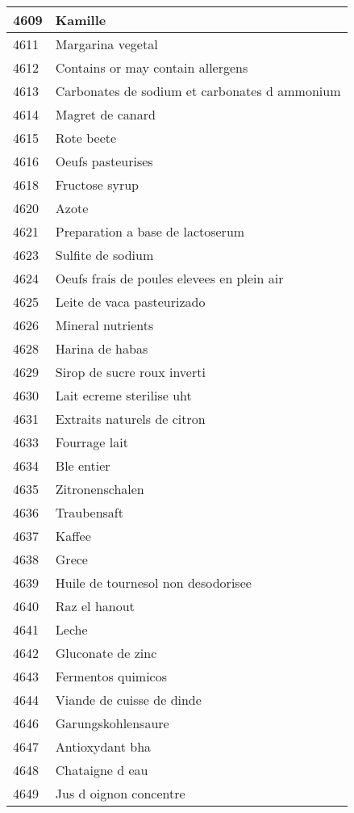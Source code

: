 \begin{longtable}{|l|l|}
4609 & Kamille \\ \hline 
4611 & Margarina vegetal \\ \hline 
4612 & Contains or may contain allergens \\ \hline 
4613 & Carbonates de sodium et carbonates d ammonium \\ \hline 
4614 & Magret de canard \\ \hline 
4615 & Rote beete \\ \hline 
4616 & Oeufs pasteurises \\ \hline 
4618 & Fructose syrup \\ \hline 
4620 & Azote \\ \hline 
4621 & Preparation a base de lactoserum \\ \hline 
4623 & Sulfite de sodium \\ \hline 
4624 & Oeufs frais de poules elevees en plein air \\ \hline 
4625 & Leite de vaca pasteurizado \\ \hline 
4626 & Mineral nutrients \\ \hline 
4628 & Harina de habas \\ \hline 
4629 & Sirop de sucre roux inverti \\ \hline 
4630 & Lait ecreme sterilise uht \\ \hline 
4631 & Extraits naturels de citron \\ \hline 
4633 & Fourrage lait \\ \hline 
4634 & Ble entier \\ \hline 
4635 & Zitronenschalen \\ \hline 
4636 & Traubensaft \\ \hline 
4637 & Kaffee \\ \hline 
4638 & Grece \\ \hline 
4639 & Huile de tournesol non desodorisee \\ \hline 
4640 & Raz el hanout \\ \hline 
4641 & Leche \\ \hline 
4642 & Gluconate de zinc \\ \hline 
4643 & Fermentos quimicos \\ \hline 
4644 & Viande de cuisse de dinde \\ \hline 
4646 & Garungskohlensaure \\ \hline 
4647 & Antioxydant bha \\ \hline 
4648 & Chataigne d eau \\ \hline 
4649 & Jus d oignon concentre \\ \hline 

\end{longtable}
